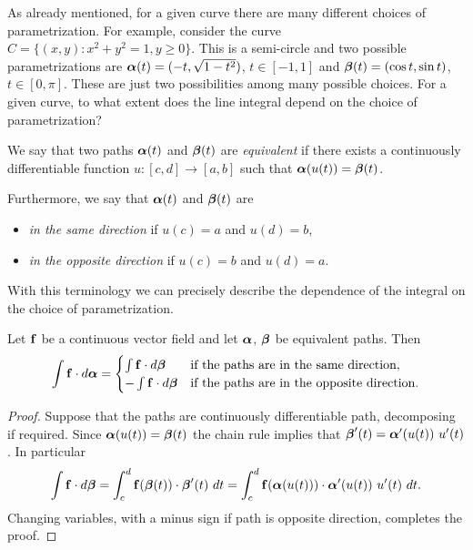 As already mentioned, for a given curve there are many different choices of parametrization.
For example, consider the curve \(C = \{(x,y) : x^2 + y^2 = 1, y\geq 0\}\).
This is a semi-circle and two possible parametrizations are
\(\boldsymbol{\alpha}(t) = (-t, \sqrt{1-t^2})\), \(t\in [-1,1]\)
and
\(\boldsymbol{\beta}(t) = (\cos t, \sin t)\), \(t\in [0,\pi]\).
These are just two possibilities among many possible choices.
For a given curve, to what extent does the line integral depend on the choice of parametrization?

\begin{definition}
    We say that two paths \(\boldsymbol{\alpha}(t)\) and \(\boldsymbol{\beta}(t)\) are \emph{equivalent} if there exists a continuously differentiable function \(u : [c,d] \to [a,b] \) such that \(\boldsymbol{\alpha}(u(t)) = \boldsymbol{\beta}(t)\).

    Furthermore, we say that \(\boldsymbol{\alpha}(t)\) and \(\boldsymbol{\beta}(t)\) are
    \begin{itemize}
        \item \emph{in the same direction} if \(u(c)=a\) and \(u(d)=b\),
        \item \emph{in the opposite direction} if \(u(c)=b\) and \(u(d)=a\).
    \end{itemize}
\end{definition}

With this terminology we can precisely describe the dependence of the integral on the choice of parametrization.

\begin{theorem}%
    \label{thm:change-param}
    Let \(\mathbf{f}\) be a continuous vector field and let \(\boldsymbol{\alpha}\), \(\boldsymbol{\beta}\) be equivalent paths.
    Then
    \[
        \int \mathbf{f} \cdot d\boldsymbol{\alpha} =
        \begin{cases}
            \int \mathbf{f} \cdot d\boldsymbol{\beta}   & \text{if the paths are in the same direction},     \\
            - \int \mathbf{f} \cdot d\boldsymbol{\beta} & \text{if the paths are in the opposite direction}.
        \end{cases}
    \]
\end{theorem}

\begin{proof}
    Suppose that the paths are continuously differentiable path, decomposing if required.
    Since \(\boldsymbol{\alpha}(u(t)) = \boldsymbol{\beta}(t)\) the chain rule implies that
    \( \bbeta'(t) = \aalpha'(u(t)) \ u'(t)\).
    In particular
    \[
        \displaystyle \int \mathbf{f} \cdot  d\boldsymbol{\beta} = \displaystyle \int_c^d \mathbf{f}(\boldsymbol{\beta}(t)) \cdot \boldsymbol{\beta}'(t) \ dt =  \displaystyle \int_c^d \mathbf{f}(\boldsymbol{\alpha}(u(t))) \cdot \boldsymbol{\alpha}'(u(t)) \ u'(t) \ dt.
    \]
    Changing variables, with a minus sign if path is opposite direction, completes the proof.
\end{proof}



